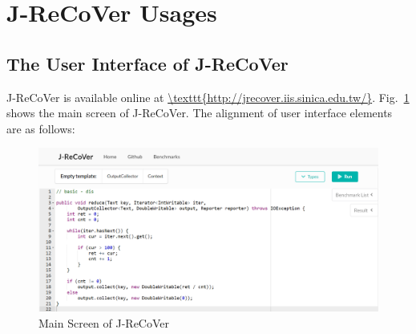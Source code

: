 % 
\clearpage
\appendix

\section{J-ReCoVer Usages}

\subsection{The User Interface of J-ReCoVer}
\label{appendix:1}

J-ReCoVer is available online at \url{\texttt{http://jrecover.iis.sinica.edu.tw/}}. Fig.~\ref{fig:main_screen} shows the main screen of J-ReCoVer. The alignment of user interface elements are as follows:

\begin{figure}
\begin{center}
\includegraphics[width=.9\linewidth]{screenshots/main_screen}
\caption{Main Screen of J-ReCoVer}
\label{fig:main_screen}
\end{center}
\end{figure}


